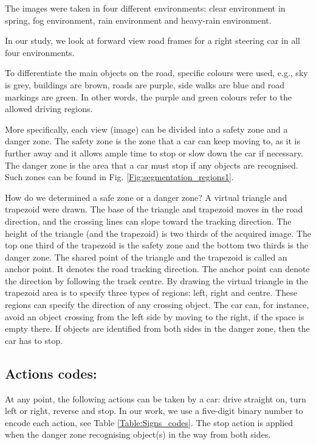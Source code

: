 \documentclass{svproc}
\begin{document}
The images were taken in four different environments: clear
environment in spring, fog environment, rain environment and
heavy-rain environment.

In our study, we look at forward view road frames for a right steering car in all four environments. 

To differentiate the main objects on the road, specific colours were used, e.g., sky is grey, buildings are brown, roads are purple, side walks are blue and road markings are green. In other words, the purple and green colours refer to the allowed driving regions.  

More specifically, each view (image) can be divided into a safety zone and a danger zone. The safety zone is the zone that a car can keep moving to, as it is further away and it allows ample time to stop or slow down the car if necessary. The danger zone is the area that a car must stop if any objects are recognised. Such zones can be found in Fig. \ref{Fig:segmentation_regions1}. 

How do we determined a safe zone or a danger zone? A virtual triangle and trapezoid were drawn. The base of the triangle and trapezoid moves in the road direction, and the crossing lines can slope toward the tracking direction. The height of the triangle (and the trapezoid) is two thirds of the acquired image. The top one third of the trapezoid is the safety zone and the bottom two thirds is the danger zone. The shared point of the triangle and the trapezoid is called an anchor point. It denotes the road tracking direction. The anchor point can denote the direction by following the track centre. By drawing the virtual triangle in the trapezoid area is to specify three types of regions: left, right and centre. These regions can specify the direction of any crossing object. The car can, for instance, avoid an object crossing from the left side by moving to the right, if the space is empty there. If objects are identified from both sides in the danger zone, then the car has to stop.  

\subsection{Actions codes:} 
At any point, the following actions can be taken by a car: drive straight on, turn left or right, reverse and stop. In our work, we use a five-digit binary number to encode each action, see Table \ref{Table:Signs_codes}. The stop action is applied when the danger zone recognising object(s) in the way from both sides. 
\end{document}
